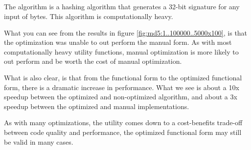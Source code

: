 \subsection{}
The  algorithm is a hashing algorithm that generates a 32-bit signature for any input of bytes. This algorithm is computationally heavy.

What you can see from the results in figure \ref{fig:md5:1..100000..5000x100}, is that the optimization was unable to out perform the manual form.  As with most computationally heavy utility functions, manual optimization is more likely to out perform and be worth the cost of manual optimization.  

What is also clear, is that from the functional form to the optimized functional form, there is a dramatic increase in performance.  What we see is about a 10x speedup between the optimized and non-optimized algorithm, and about a 3x speedup between the optimized and manual implementations.  

As with many optimizations, the utility comes down to a cost-benefits trade-off between code quality and performance, the optimized functional form may still be valid in many cases.